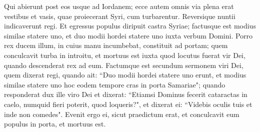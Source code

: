 \begin{biblechapter}
\verse Qui abierunt post eos usque ad Iordanem; ecce autem omnis via plena erat vestibus et vasis, quae proiecerant Syri, cum turbarentur. Reversique nuntii indicaverunt regi. 
\verse Et egressus populus diripuit castra Syriae; factusque est modius similae statere uno, et duo modii hordei statere uno iuxta verbum Domini. 
\verse Porro rex ducem illum, in cuius manu incumbebat, constituit ad portam; quem conculcavit turba in introitu, et mortuus est iuxta quod locutus fuerat vir Dei, quando descenderat rex ad eum. 
\verse Factumque est secundum sermonem viri Dei, quem dixerat regi, quando ait: “Duo modii hordei statere uno erunt, et modius similae statere uno hoc eodem tempore cras in porta Samariae"; 
\verse quando responderat dux ille viro Dei et dixerat: “Etiamsi Dominus fecerit cataractas in caelo, numquid fieri poterit, quod loqueris?", et dixerat ei: “Videbis oculis tuis et inde non comedes". 
\verse Evenit ergo ei, sicut praedictum erat, et conculcavit eum populus in porta, et mortuus est. 
\end{biblechapter}

